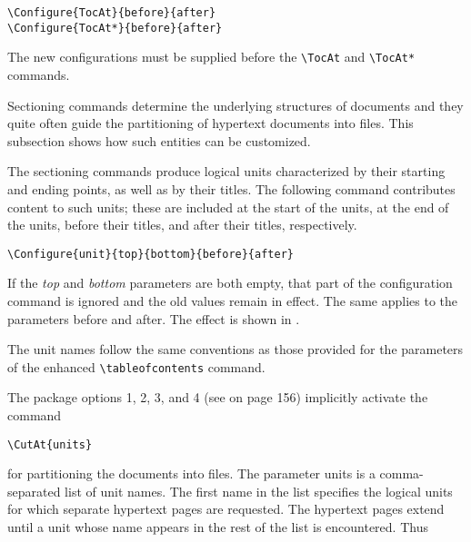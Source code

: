 \begin{lstlisting}
\Configure{TocAt}{before}{after} 
\Configure{TocAt*}{before}{after} 
\end{lstlisting}

The new configurations must be supplied before the \verb|\TocAt| and \verb|\TocAt*| commands. 


Sectioning commands determine the underlying structures of documents and they
quite often guide the partitioning of hypertext documents into files. This
subsection shows how such entities can be customized. 


The sectioning commands produce logical units characterized by their starting
and ending points, as well as by their titles. The following command
contributes content to such units; these are included at the start of the
units, at the end of the units, before their titles, and after their titles,
respectively. 

\begin{lstlisting}
\Configure{unit}{top}{bottom}{before}{after} 
\end{lstlisting}

If the \emph{top} and \emph{bottom} parameters are both empty, that part of the
configuration command is ignored and the old values remain in effect. The same
applies to the parameters before and after. The effect is shown in . 

The unit names follow the same conventions as those provided for the parameters
of the enhanced \verb|\tableofcontents| command. 
 


The package options 1, 2, 3, and 4 (see  on page 156) implicitly activate 
the command 

\begin{lstlisting}
\CutAt{units} 
\end{lstlisting}

for partitioning the documents into files. The parameter units is a comma-separated 
list of unit names. The first name in the list specifies the logical units for which 
separate hypertext pages are requested. The hypertext pages extend until a unit 
whose name appears in the rest of the list is encountered. Thus 

